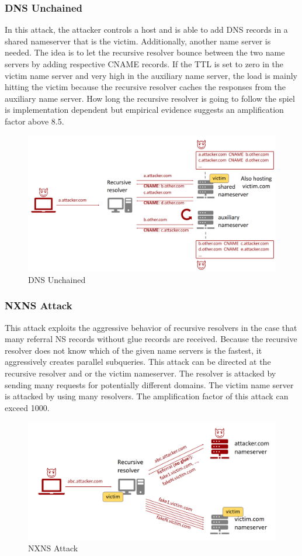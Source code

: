 \subsubsection{DNS Unchained}
In this attack, the attacker controls a host and is able to add DNS records in a shared nameserver that is the victim. Additionally, another name server is needed. The idea is to let the recursive resolver bounce between the two name servers by adding respective CNAME records. If the TTL is set to zero in the victim name server and very high in the auxiliary name server, the load is mainly hitting the victim because the recursive resolver caches the responses from the auxiliary name server. How long the recursive resolver is going to follow the spiel is implementation dependent but empirical evidence suggests an amplification factor above 8.5.
\begin{figure}[H]
\centering
\includegraphics[width=.7\textwidth]{images/unchained.PNG}
\caption{DNS Unchained}
\label{unchained}
\end{figure}

\subsubsection{NXNS Attack}
This attack exploits the aggressive behavior of recursive resolvers in the case that many referral NS records without glue records are received. Because the recursive resolver does not know which of the given name servers is the fastest, it aggressively creates parallel subqueries. This attack can be directed at the recursive resolver and or the victim nameserver. The resolver is attacked by sending many requests for potentially different domains. The victim name server is attacked by using many resolvers. The amplification factor of this attack can exceed 1000.
\begin{figure}[H]
\centering
\includegraphics[width=.7\textwidth]{images/nxns.PNG}
\caption{NXNS Attack}
\label{nxns}
\end{figure}

